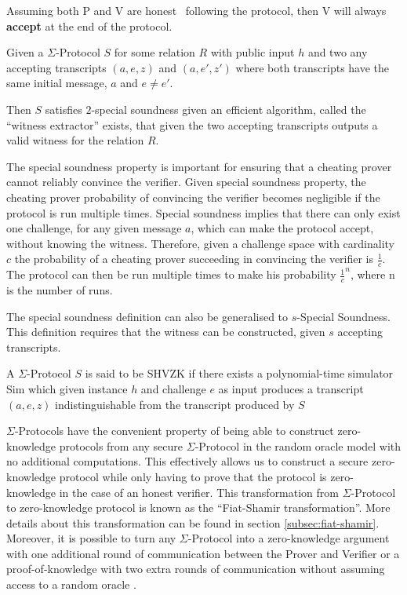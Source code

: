 \begin{definition}[Completeness]
  Assuming both P and V are honest \ie\ following the protocol, then V will always \textbf{accept} at
  the end of the protocol.
\end{definition}

\begin{definition}
Given a $\Sigma$-Protocol $S$ for some relation $R$ with public input $h$
and two any accepting transcripts $(a,e,z)$ and $(a,e',z')$
where both transcripts have the same initial message, $a$ and $e \neq e'$.

Then $S$ satisfies $2$-special soundness given an efficient
algorithm, called the ``witness extractor'' exists, that
given the two accepting transcripts outputs a valid witness for the relation $R$.
\end{definition}

The special soundness property is important for ensuring that a cheating prover
cannot reliably convince the verifier.
Given special soundness property, the cheating prover probability of convincing
the verifier becomes negligible if the protocol is run multiple times.
Special soundness implies that there can
only exist one challenge, for any given message $a$, which can make the
protocol accept, without knowing the witness. Therefore, given a challenge space
with cardinality $c$ the probability of a cheating prover succeeding in
convincing the verifier is $\frac{1}{c}$. The protocol can then be run multiple
times to make his probability $\frac{1}{c}^{n}$, where n is the number of runs.

The special soundness definition can also be generalised to $s$-Special
Soundness. This definition requires that the witness can be constructed, given
$s$ accepting transcripts.

\begin{definition}
  A $\Sigma$-Protocol $S$ is said to be SHVZK if there exists a polynomial-time
  simulator Sim which given instance $h$ and challenge $e$ as input produces a
  transcript $(a,e,z)$ indistinguishable from the transcript produced by $S$
\end{definition}

$\Sigma$-Protocols have the convenient property of being able to construct
zero-knowledge protocols from any secure $\Sigma$-Protocol in the random oracle
model with no additional computations. This effectively allows us to construct a
secure zero-knowledge protocol while only having to prove that the protocol is
zero-knowledge in the case of an honest verifier. This transformation from
$\Sigma$-Protocol to zero-knowledge protocol is known as the ``Fiat-Shamir
transformation''. More details about this transformation can be found in section
\ref{subsec:fiat-shamir}.
Moreover, it is possible to turn any $\Sigma$-Protocol into a zero-knowledge
argument with one additional round of communication between the Prover and
Verifier or a proof-of-knowledge with two extra rounds of communication without
assuming access to a random oracle \cite{on-sigma-protocols}.


